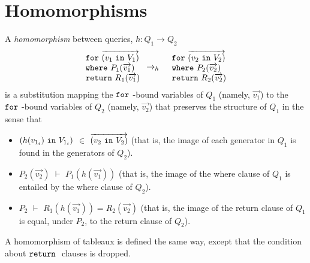 \documentclass[preprint]{sigplanconf}
\newcommand{\FOR}{{\tt for} \ }
\newcommand{\WHERE}{{\tt where} \ }
\newcommand{\IN}{ \ {\tt in} \ }
\newcommand{\RETURN}{{\tt return} \ }
\begin{document}
\section{Homomorphisms}

A {\it homomorphism} between queries, $h : Q_1 \to Q_2$ 
\begin{eqnarray*}
\begin{array}{l}
\FOR \overrightarrow{(v_1 \IN V_1)} \\
\WHERE P_1(\overrightarrow{v_1}) \\
\RETURN R_1(\overrightarrow{v_1})
\end{array} & \to_h &
\begin{array}{l}
\FOR \overrightarrow{(v_2 \IN V_2)} \\
\WHERE P_2(\overrightarrow{v_2}) \\
\RETURN R_2(\overrightarrow{v_2})
\end{array}
\end{eqnarray*}
is a substitution mapping the $\FOR$-bound variables of $Q_1$ (namely, $
\overrightarrow{v_1}$) to the $\FOR$-bound variables of $Q_2$ (namely, $
\overrightarrow{v_2}$) that preserves the structure of $Q_1$ in the sense that
\begin{itemize}
\item  
 $(h(v_{1_i}) \IN V_{1_i})$ $ \in$ $\overrightarrow{(v_2 \IN V_2)}$ (that is, the image of each generator in $Q_1$ is found in the generators of $Q_2$). 

\item $P_2(\overrightarrow{v_2})$ $\vdash$ $P_1(h(\overrightarrow{v_1}))$  (that is, the image of the where clause of $Q_1$ is entailed by the where clause of $Q_2$).

\item $P_2$ $\vdash$ $R_1(h(\overrightarrow{v_1})) = R_2(\overrightarrow{v_2})$ (that is, the image of the return clause of $Q_1$ is equal, under $P_2$, to the return clause of $Q_2$).
\end{itemize}
A homomorphism of tableaux is defined the same way, except that the condition about $\RETURN$ clauses is dropped.  
\end{document}

